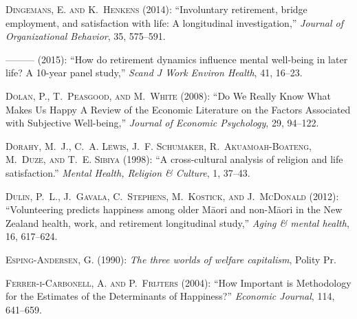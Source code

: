 \documentclass[10pt, letterpaper]{article}
\begin{document}
\begin{spacing}{1.4}
\begin{spacing}{.9}
\begin{thebibliography}{71}
\textsc{Dingemans, E. and K.~Henkens} (2014): \enquote{Involuntary retirement,
  bridge employment, and satisfaction with life: A longitudinal investigation,}
  \emph{Journal of Organizational Behavior}, 35, 575--591.

---\hspace{-.1pt}---\hspace{-.1pt}--- (2015): \enquote{How do retirement
  dynamics influence mental well-being in later life? A 10-year panel study,}
  \emph{Scand J Work Environ Health}, 41, 16--23.

\textsc{Dolan, P., T.~Peasgood, and M.~White} (2008): \enquote{Do We Really
  Know What Makes Us Happy A Review of the Economic Literature on the Factors
  Associated with Subjective Well-being,} \emph{Journal of Economic
  Psychology}, 29, 94--122.

\textsc{Dorahy, M.~J., C.~A. Lewis, J.~F. Schumaker, R.~Akuamoah-Boateng,
  M.~Duze, and T.~E. Sibiya} (1998): \enquote{A cross-cultural analysis of
  religion and life satisfaction.} \emph{Mental Health, Religion \& Culture},
  1, 37--43.

\textsc{Dulin, P.~L., J.~Gavala, C.~Stephens, M.~Kostick, and J.~McDonald}
  (2012): \enquote{Volunteering predicts happiness among older M{\=a}ori and
  non-M{\=a}ori in the New Zealand health, work, and retirement longitudinal
  study,} \emph{Aging \& mental health}, 16, 617--624.

\textsc{Esping-Andersen, G.} (1990): \emph{{The three worlds of welfare
  capitalism}}, Polity Pr.

\textsc{{Ferrer-i-Carbonell}, A. and P.~Frijters} (2004): \enquote{How
  Important is Methodology for the Estimates of the Determinants of Happiness?}
  \emph{Economic Journal}, 114, 641--659.


\end{thebibliography}
\end{spacing}
\end{spacing}
\end{document}
